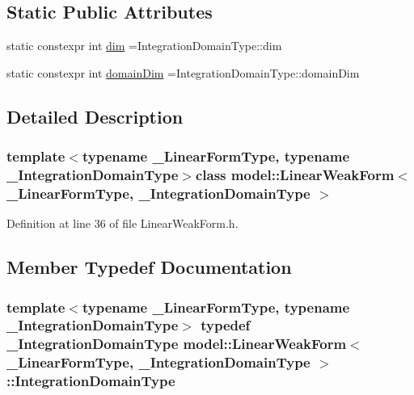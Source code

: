 \subsection*{Static Public Attributes}
\begin{DoxyCompactItemize}
\item 
static constexpr int \hyperlink{classmodel_1_1_linear_weak_form_aca4fd8b34145cb88e4d88cc6f4c0b7d0}{dim} =Integration\+Domain\+Type\+::dim
\item 
static constexpr int \hyperlink{classmodel_1_1_linear_weak_form_a24e73a68c0db2e41067cacb7a24f6553}{domain\+Dim} =Integration\+Domain\+Type\+::domain\+Dim
\end{DoxyCompactItemize}


\subsection{Detailed Description}
\subsubsection*{template$<$typename \+\_\+\+Linear\+Form\+Type, typename \+\_\+\+Integration\+Domain\+Type$>$class model\+::\+Linear\+Weak\+Form$<$ \+\_\+\+Linear\+Form\+Type, \+\_\+\+Integration\+Domain\+Type $>$}



Definition at line 36 of file Linear\+Weak\+Form.\+h.



\subsection{Member Typedef Documentation}
\hypertarget{classmodel_1_1_linear_weak_form_a5a2c3fddd71479eb47af0c4ec7657b0a}{}
\subsubsection[{Integration\+Domain\+Type}]{\setlength{\rightskip}{0pt plus 5cm}template$<$typename \+\_\+\+Linear\+Form\+Type, typename \+\_\+\+Integration\+Domain\+Type$>$ typedef \+\_\+\+Integration\+Domain\+Type {\bf model\+::\+Linear\+Weak\+Form}$<$ \+\_\+\+Linear\+Form\+Type, \+\_\+\+Integration\+Domain\+Type $>$\+::{\bf Integration\+Domain\+Type}}\label{classmodel_1_1_linear_weak_form_a5a2c3fddd71479eb47af0c4ec7657b0a}


